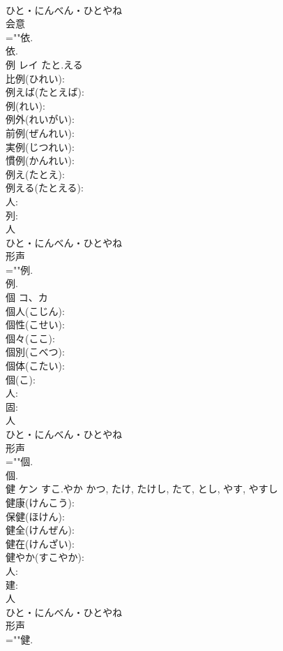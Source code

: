 \documentclass[8pt]{extreport}
\begin{document}
\begin{CJK}{UTF8}{min}
\\	ひと・にんべん・ひとやね	
\\	会意 
\\	=""依.
\\	依.
\\	例	レイ	たと.える		
\\	比例(ひれい): 
\\	例えば(たとえば): 
\\	例(れい): 
\\	例外(れいがい): 
\\	前例(ぜんれい): 
\\	実例(じつれい): 
\\	慣例(かんれい): 
\\	例え(たとえ): 
\\	例える(たとえる): 
\\	人: 
\\	列: 
\\	人	
\\	ひと・にんべん・ひとやね	
\\	形声 
\\	=""例.
\\	例.
\\	個	コ、カ			
\\	個人(こじん): 
\\	個性(こせい): 
\\	個々(ここ): 
\\	個別(こべつ): 
\\	個体(こたい): 
\\	個(こ): 
\\	人: 
\\	固: 
\\	人	
\\	ひと・にんべん・ひとやね	
\\	形声 
\\	=""個.
\\	個.
\\	健	ケン	すこ.やか	かつ, たけ, たけし, たて, とし, やす, やすし	
\\	健康(けんこう): 
\\	保健(ほけん): 
\\	健全(けんぜん): 
\\	健在(けんざい): 
\\	健やか(すこやか): 
\\	人: 
\\	建: 
\\	人	
\\	ひと・にんべん・ひとやね	
\\	形声 
\\	=""健.

\end{CJK}
\end{document}
